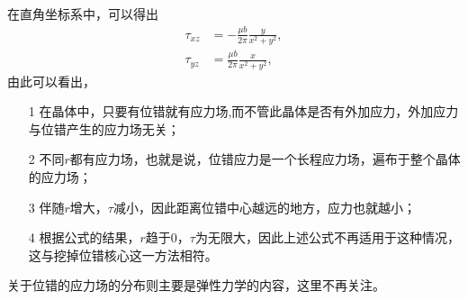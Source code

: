             在直角坐标系中，可以得出
            \begin{align}
                \tau_{xz}&=-\frac{\mu b}{2\pi}\frac{y}{x^2+y^2},\\
                \tau_{yz}&=\frac{\mu b}{2\pi}\frac{x}{x^2+y^2},
            \end{align}
            由此可以看出，
            \begin{itemize}
                \item[1] 在晶体中，只要有位错就有应力场,而不管此晶体是否有外加应力，外加应力与位错产生的应力场无关；
                \item[2] 不同$r$都有应力场，也就是说，位错应力是一个长程应力场，遍布于整个晶体的应力场；
                \item[3] 伴随$r$增大，$\tau$减小，因此距离位错中心越远的地方，应力也就越小；
                \item[4] 根据公式的结果，$r$趋于0，$\tau$为无限大，因此上述公式不再适用于这种情况，这与挖掉位错核心这一方法相符。
            \end{itemize}
            关于位错的应力场的分布则主要是弹性力学的内容，这里不再关注。

